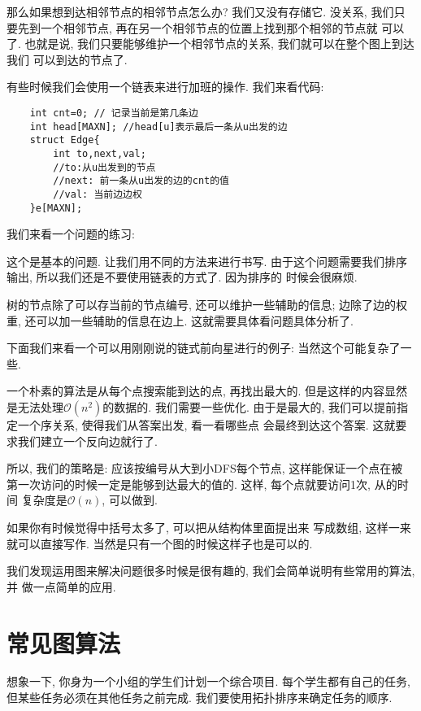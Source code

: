 那么如果想到达相邻节点的相邻节点怎么办? 我们又没有存储它.
没关系, 我们只要先到一个相邻节点, 再在另一个相邻节点的位置上找到那个相邻的节点就
可以了. 也就是说, 我们只要能够维护一个相邻节点的关系, 我们就可以在整个图上到达我们
可以到达的节点了. 

 有些时候我们会使用一个链表来进行加班的操作. 
我们来看代码: 

\begin{lstlisting}
    int cnt=0; // 记录当前是第几条边
    int head[MAXN]; //head[u]表示最后一条从u出发的边
    struct Edge{
        int to,next,val;
        //to:从u出发到的节点
	    //next: 前一条从u出发的边的cnt的值
	    //val: 当前边边权
    }e[MAXN];
\end{lstlisting}

我们来看一个问题的练习: 

 这个是基本的问题. 让我们用不同的方法来进行书写. 
由于这个问题需要我们排序输出, 所以我们还是不要使用链表的方式了. 因为排序的
时候会很麻烦. 

树的节点除了可以存当前的节点编号, 还可以维护一些辅助的信息; 边除了边的权重, 
还可以加一些辅助的信息在边上. 这就需要具体看问题具体分析了. 

下面我们来看一个可以用刚刚说的链式前向星进行的例子: 当然这个可能复杂了一些. 

 一个朴素的算法是从每个点搜索能到达的点, 再找出最大的.
但是这样的内容显然是无法处理$\mathcal O(n^2)$的数据的. 我们需要一些优化. 
由于是最大的, 我们可以提前指定一个序关系, 使得我们从答案出发, 看一看哪些点
会最终到达这个答案. 这就要求我们建立一个反向边就行了. 

所以, 我们的策略是: 应该按编号从大到小DFS每个节点, 这样能保证一个点在被
第一次访问的时候一定是能够到达最大的值的. 这样, 每个点就要访问1次, 从的时间
复杂度是$\mathcal O(n)$, 可以做到. 

如果你有时候觉得中括号太多了, 可以把从结构体里面提出来
写成数组, 这样一来就可以直接写作. 
当然是只有一个图的时候这样子也是可以的. 

我们发现运用图来解决问题很多时候是很有趣的, 我们会简单说明有些常用的算法, 并
做一点简单的应用. 

\section{常见图算法}

 想象一下, 你身为一个小组的学生们计划一个综合项目. 
每个学生都有自己的任务, 但某些任务必须在其他任务之前完成. 
我们要使用拓扑排序来确定任务的顺序. 

